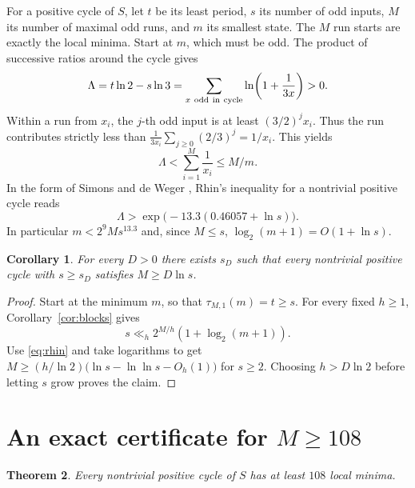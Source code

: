 \documentclass[11pt]{article}
\newtheorem{theorem}{Theorem}[section]
\newtheorem{corollary}[theorem]{Corollary}
\theoremstyle{definition}
\begin{document}
For a positive cycle of \(S\), let \(t\) be its least period, \(s\)
its number of odd inputs, \(M\) its number of maximal odd runs, and
\(m\) its smallest state. The \(M\) run starts are exactly the local
minima. Start at \(m\), which must be odd. The product of successive
ratios around the cycle gives
\begin{equation}\label{eq:cycle-gap}
 \Lambda=t\ln2-s\ln3=\sum_{x\ {\rm odd\ in\ cycle}}
             \ln\!\left(1+\frac1{3x}\right)>0.
\end{equation}
Within a run from \(x_i\), the \(j\)-th odd input is at least
\((3/2)^j x_i\). Thus the run contributes strictly less than
\(\frac1{3x_i}\sum_{j\ge0}(2/3)^j=1/x_i\). This yields
\begin{equation}\label{eq:sum-min}
 \Lambda<\sum_{i=1}^M\frac1{x_i}\le M/m .
\end{equation}
In the form of Simons and de Weger \cite[Lemma~12]{SimonsWeger},
Rhin's inequality for a nontrivial positive cycle reads
\begin{equation}\label{eq:rhin}
 \Lambda>\exp\bigl(-13.3(0.46057+\ln s)\bigr).
\end{equation}
In particular \(m<2^9 M s^{13.3}\) and, since \(M\le s\),
\(\log_2(m+1)=O(1+\ln s)\).

\begin{corollary}\label{cor:superlog}
For every \(D>0\) there exists \(s_D\) such that every nontrivial
positive cycle with \(s\ge s_D\) satisfies \(M\ge D\ln s\).
\end{corollary}

\begin{proof}
Start at the minimum \(m\), so that \(\tau_{M,1}(m)=t\ge s\).
For every fixed \(h\ge1\), Corollary~\ref{cor:blocks} gives
\[
 s\ll_h 2^{M/h}(1+\log_2(m+1)).
\]
Use \eqref{eq:rhin} and take logarithms to get
\(
 M\ge (h/\ln 2)\bigl(\ln s-\ln\ln s-O_h(1)\bigr)
\)
for \(s\ge 2\). Choosing \(h>D\ln 2\) before letting \(s\) grow
proves the claim.
\end{proof}

\section{An exact certificate for \texorpdfstring{\(M\ge108\)}{M >= 108}}
\label{sec:certificate}

\begin{theorem}\label{thm:108}
Every nontrivial positive cycle of \(S\) has at least \(108\)
local minima.
\end{theorem}
\end{document}

